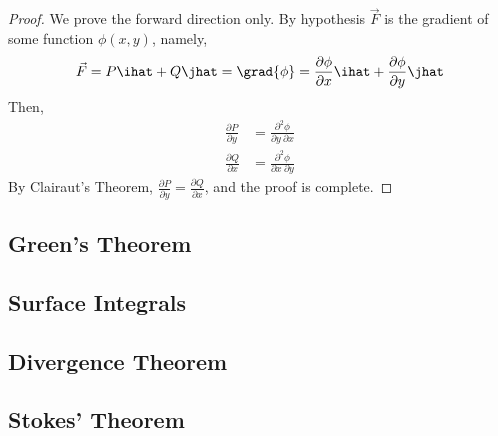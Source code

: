 \documentclass[12pt]{article}
\begin{document}
\begin{proof}
We prove the forward direction only. By hypothesis $\vec{F}$ is the gradient of some function $\phi(x,y)$, namely, \[ \vec{F} = P\ihat + Q\jhat = \grad{\phi} = \frac{\partial \phi}{\partial x}\ihat + \frac{\partial \phi}{\partial y} \jhat\]  
Then, 
\[
\begin{aligned}
\frac{\partial P}{\partial y} &= \frac{\partial^2 \phi}{\partial y \ \partial x} \\
\frac{\partial Q}{\partial x} &= \frac{\partial^2 \phi}{\partial x \ \partial y} 
\end{aligned}
\]
By Clairaut's Theorem, $\frac{\partial P}{\partial y} = \frac{\partial Q}{\partial x}$, and the proof is complete.
\end{proof}

\subsection{Green's Theorem}

\subsection{Surface Integrals}

\subsection{Divergence Theorem}

\subsection{Stokes' Theorem}
\end{document}
